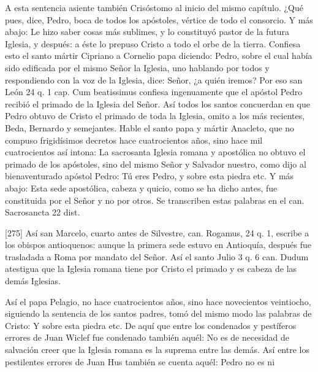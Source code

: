 A esta sentencia asiente también Crisóstomo al inicio del mismo capítulo. ¿Qué pues, dice, Pedro, boca de todos los apóstoles, vértice de todo el consorcio. Y más abajo: Le hizo saber cosas más sublimes, y lo constituyó pastor de la futura Iglesia, y después: a éste lo prepuso Cristo a todo el orbe de la tierra. Confiesa esto el santo mártir Cipriano a Cornelio papa diciendo: Pedro, sobre el cual había sido edificada por el mismo Señor la Iglesia, uno hablando por todos y respondiendo con la voz de la Iglesia, dice: Señor, ¿a quién iremos? Por eso san León 24 q. 1 cap. Cum beatissimus confiesa ingenuamente que el apóstol Pedro recibió el primado de la Iglesia del Señor. Así todos los santos concuerdan en que Pedro obtuvo de Cristo el primado de toda la Iglesia, omito a los más recientes, Beda, Bernardo y semejantes. Hable el santo papa y mártir Anacleto, que no compuso frigidísimos decretos hace cuatrocientos años, sino hace mil cuatrocientos así intona: La sacrosanta Iglesia romana y apostólica no obtuvo el primado de los apóstoles, sino del mismo Señor y Salvador nuestro, como dijo al bienaventurado apóstol Pedro: Tú eres Pedro, y sobre esta piedra etc. Y más abajo: Esta sede apostólica, cabeza y quicio, como se ha dicho antes, fue constituida por el Señor y no por otros. Se transcriben estas palabras en el can. Sacrosancta 22 dist.

[275] Así san Marcelo, cuarto antes de Silvestre, can. Rogamus, 24 q. 1, escribe a los obispos antioquenos: aunque la primera sede estuvo en Antioquía, después fue trasladada a Roma por mandato del Señor. Así el santo Julio 3 q. 6 can. Dudum atestigua que la Iglesia romana tiene por Cristo el primado y es cabeza de las demás Iglesias.

Así el papa Pelagio, no hace cuatrocientos años, sino hace novecientos veintiocho, siguiendo la sentencia de los santos padres, tomó del mismo modo las palabras de Cristo: Y sobre esta piedra etc. De aquí que entre los condenados y pestíferos errores de Juan Wiclef fue condenado también aquél: No es de necesidad de salvación creer que la Iglesia romana es la suprema entre las demás. Así entre los pestilentes errores de Juan Hus también se cuenta aquél: Pedro no es ni

